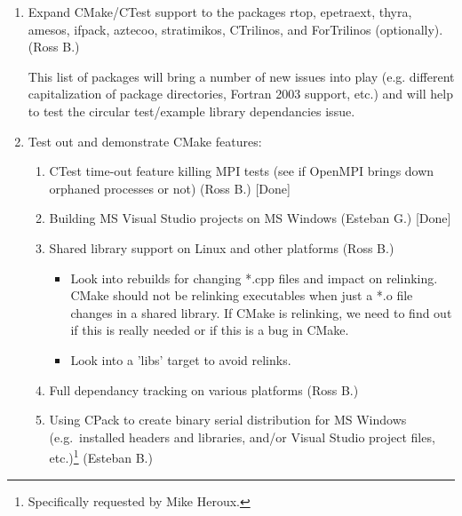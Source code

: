 \documentclass[pdf,ps2pdf,11pt]{SANDreport}
\begin{document}
\begin{enumerate}
\begin{enumerate}
  \end{enumerate}

{}\item Expand CMake/CTest support to the packages rtop, epetraext,
thyra, amesos, ifpack, aztecoo, stratimikos, CTrilinos, and
ForTrilinos (optionally). (Ross B.)

This list of packages will bring a number of new issues into play
(e.g. different capitalization of package directories, Fortran 2003
support, etc.)  and will help to test the circular test/example
library dependancies issue.

{}\item Test out and demonstrate CMake features:

  \begin{enumerate}

  {}\item CTest time-out feature killing MPI tests (see if OpenMPI
  brings down orphaned processes or not) (Ross B.) [Done]

  {}\item Building MS Visual Studio projects on MS Windows (Esteban
  G.) [Done]

  {}\item Shared library support on Linux and other platforms (Ross B.)

    \begin{itemize}

    {}\item Look into rebuilds for changing *.cpp files and impact on
    relinking.  CMake should not be relinking executables when just a
    *.o file changes in a shared library.  If CMake is relinking, we
    need to find out if this is really needed or if this is a bug in
    CMake.

    {}\item Look into a 'libs' target to avoid relinks.

    \end{itemize}

  {}\item Full dependancy tracking on various platforms (Ross B.)

  {}\item Using CPack to create binary serial distribution for MS
  Windows (e.g.\ installed headers and libraries, and/or Visual Studio
  project files, etc.)\footnote{Specifically requested by Mike
  Heroux.} (Esteban B.)

  \end{enumerate}

\end{enumerate}
\end{document}
